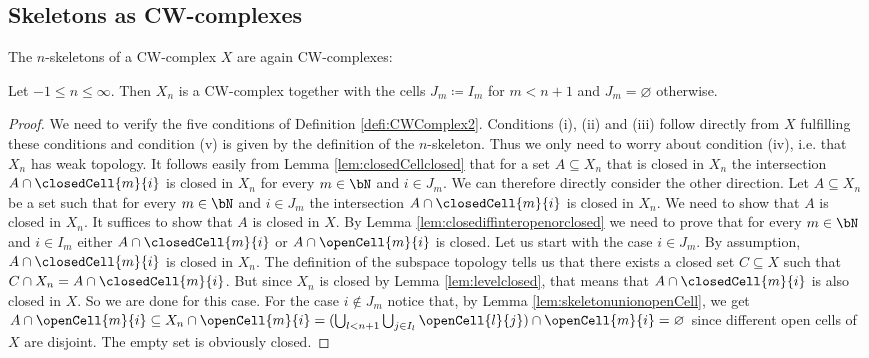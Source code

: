 \subsection{Skeletons as CW-complexes}

The $n$-skeletons of a CW-complex $X$ are again CW-complexes: 

\begin{lem} \label{lem:levelcwcomplex}
    Let $-1 \le n \le \infty$. 
    Then $X_n$ is a CW-complex together with the cells $J_m \coloneq I_m$ for $m < n + 1$ and $J_m = \varnothing$ otherwise.
    \href{https://github.com/scholzhannah/CWComplexes/blob/7be4872a05b534011cc969eb5b80a4b7f0bf57e2/CWcomplexes/Constructions.lean#L66-L67}{\faExternalLink}
\end{lem}
\begin{proof}
    We need to verify the five conditions of Definition \ref{defi:CWComplex2}.
    Conditions (i), (ii) and (iii) follow directly from $X$ fulfilling these conditions and condition (v) is given by the definition of the $n$-skeleton. 
    Thus we only need to worry about condition (iv), i.e. that $X_n$ has weak topology. 
    It follows easily from Lemma \ref{lem:closedCellclosed} that for a set $A \subseteq X_n$ that is closed in $X_n$ the intersection $A \cap \closedCell{m}{i}$ is closed in $X_n$ for every $m \in \bN$ and $i \in J_m$. 
    We can therefore directly consider the other direction. 
    Let $A \subseteq X_n$ be a set such that for every $m \in \bN$ and $i \in J_m$ the intersection $A \cap \closedCell{m}{i}$ is closed in $X_n$. 
    We need to show that $A$ is closed in $X_n$. 
    It suffices to show that $A$ is closed in $X$. 
    By Lemma \ref{lem:closediffinteropenorclosed} we need to prove that for every $m \in \bN$ and $i \in I_m$ either $A \cap \closedCell{m}{i}$ or $A \cap \openCell{m}{i}$ is closed. 
    Let us start with the case $i \in J_m$. 
    By assumption, $A \cap \closedCell{m}{i}$ is closed in $X_n$. 
    The definition of the subspace topology tells us that there exists a closed set $C \subseteq X$ such that $C \cap X_n = A \cap \closedCell{m}{i}$. 
    But since $X_n$ is closed by Lemma \ref{lem:levelclosed}, that means that $A \cap \closedCell{m}{i}$ is also closed in $X$. 
    So we are done for this case. 
    For the case $i \notin J_m$ notice that, by Lemma \ref{lem:skeletonunionopenCell}, we get $A \cap \openCell{m}{i} \subseteq X_n \cap \openCell{m}{i} = (\bigcup_{l < n + 1}\bigcup_{j \in I_l}\openCell{l}{j}) \cap \openCell{m}{i} = \varnothing$ since different open cells of $X$ are disjoint. 
    The empty set is obviously closed.
\end{proof}